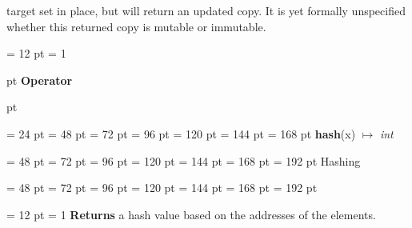 {{target set in place, but will return an updated copy. It is yet formally
unspecified whether this returned copy is mutable or immutable.
\par}
{\par \pagebreak[3.300000] \noindent \hangindent = 12 pt \hangafter = 1 
{\par \pagebreak[3]  pt \noindent
{\Large {\bf Operator\/}}\par {} pt
} \noindent
\par}
{\par \noindent  \leftskip = 24 pt  \leftmargini = 48 pt  \leftmarginii = 72 pt  \leftmarginiii = 96 pt  \leftmarginiv = 120 pt  \leftmarginv = 144 pt  \leftmarginvi = 168 pt {\large {\bf hash\/}}(x) \(\mapsto \)  {\em int\/}{\par \noindent
{\par \noindent  \leftskip = 48 pt  \leftmargini = 72 pt  \leftmarginii = 96 pt  \leftmarginiii = 120 pt  \leftmarginiv = 144 pt  \leftmarginv = 168 pt  \leftmarginvi = 192 pt  Hashing\par}
{\par \noindent  \leftskip = 48 pt  \leftmargini = 72 pt  \leftmarginii = 96 pt  \leftmarginiii = 120 pt  \leftmarginiv = 144 pt  \leftmarginv = 168 pt  \leftmarginvi = 192 pt {\par \noindent
{\par \pagebreak[3.100000] \noindent \hangindent = 12 pt \hangafter = 1 
{\bf Returns \/} a hash value based on the addresses of the elements.

\par}
\par}
\par}
\par}
\par}
\par}
